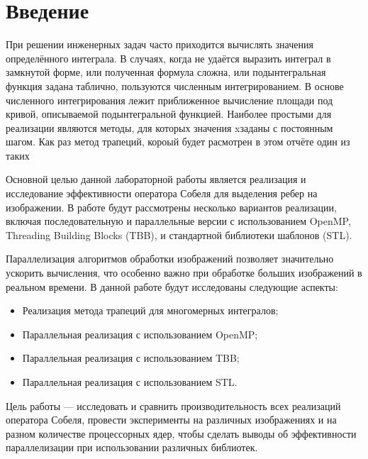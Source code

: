 \documentclass[]{article}
\theoremstyle{remark}
\theoremstyle{definition}
\begin{document}
\setcounter{page}{2}

\tableofcontents
\newpage

\section{Введение}

\par При решении инженерных задач часто приходится вычислять значения определённого интеграла. В случаях, когда не удаётся выразить интеграл в замкнутой форме, или полученная формула сложна, или подынтегральная функция задана таблично, пользуются численным интегрированием. В основе численного интегрирования лежит приближенное вычисление площади под кривой, описываемой подынтегральной функцией. Наиболее простыми для реализации являются методы, для которых значения xзаданы с постоянным шагом. Как раз метод трапеций, короый будет расмотрен в этом отчёте один из таких 

\par Основной целью данной лабораторной работы является реализация и исследование эффективности оператора Собеля для выделения ребер на изображении. В работе будут рассмотрены несколько вариантов реализации, включая последовательную и параллельные версии с использованием OpenMP, Threading Building Blocks (TBB), и стандартной библиотеки шаблонов (STL).

\par Параллелизация алгоритмов обработки изображений позволяет значительно ускорить вычисления, что особенно важно при обработке больших изображений в реальном времени. В данной работе будут исследованы следующие аспекты:

\begin{itemize}
    \item Реализация метода трапеций для многомерных интегралов;
    \item Параллельная реализация с использованием OpenMP;
    \item Параллельная реализация с использованием TBB;
    \item Параллельная реализация с использованием STL.
\end{itemize}

\par Цель работы — исследовать и сравнить производительность всех реализаций оператора Собеля, провести эксперименты на различных изображениях и на разном количестве процессорных ядер, чтобы сделать выводы об эффективности параллелизации при использовании различных библиотек.
\end{document}
